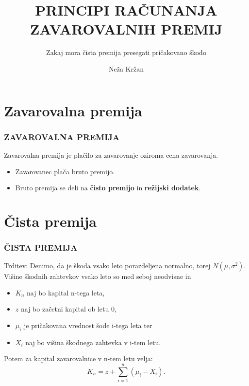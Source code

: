 \documentclass{beamer}
\begin{document}
\title[Principi računanja zavarovalnih premij]{PRINCIPI RAČUNANJA ZAVAROVALNIH PREMIJ}
\subtitle{Zakaj mora čista premija presegati pričakovano škodo}
\author{Neža Kržan}
\date{}

\begin{frame}
	\titlepage
\end{frame}

\section{Zavarovalna premija}
\begin{frame}
	\frametitle{ZAVAROVALNA PREMIJA}
	   \begin{alertblock}{}
		Zavarovalna premija je plačilo za zavarovanje oziroma cena zavarovanja.
	\end{alertblock}
\vspace{0.5cm}
\begin{itemize}
\item<1->Zavarovanec plača bruto premijo.\\
\item<2->Bruto premija se deli na \textbf{čisto premijo} in \textbf{režijski dodatek}.
\end{itemize}
\end{frame}

\section{Čista premija}
\begin{frame}
	\frametitle{ČISTA PREMIJA}
	\begin{alertblock}{Trditev:}
		Denimo, da je škoda vsako leto porazdeljena normalno, torej $N(\mu, \sigma ^2)$. Višine škodnih zahtevkov vsako leto so med seboj neodvisne in 
		\begin{itemize}
			\item $K_n$ naj bo kapital n-tega leta,
			\item $z$ naj bo začetni kapital ob letu $0$,
			\item $\mu_i$ je pričakovana vrednost šode i-tega leta ter
			\item $X_i$ naj bo višina škodnega zahtevka v i-tem letu.
		\end{itemize}
		Potem za kapital zavarovalnice v n-tem letu velja:
		\[
		K_n = z + \sum_{i=1}^n (\mu_i - X_i).
		\]
	\end{alertblock}
\end{frame}
\end{document}
